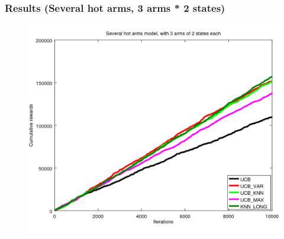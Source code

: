 \documentclass[french]{beamer}
\begin{document}
\begin{frame}
	\frametitle{Results (Several hot arms, 3 arms * 2 states)}
		
	\begin{figure}[h]
		\begin{center}
			\vspace{-10pt}
			\includegraphics[width=1.05\textheight]{all_m_10000it.png}
			
			\vspace{-10pt}
		\end{center}
	\end{figure}
\end{frame}
\end{document}
